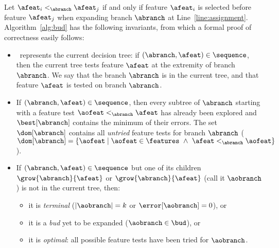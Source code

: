 \documentclass{article}
\begin{document}

Let $\afeat_i <_{\abranch} \afeat_j$ if and only if feature $\afeat_i$ is selected before feature $\afeat_j$ when expanding branch $\abranch$ at Line~\ref{line:assignment}. Algorithm~\ref{alg:bud} has the following invariants, from which a formal proof of correctness easily follows:

\begin{itemize}
	\item \sequence\ represents the current decision tree: if $(\abranch,\afeat) \in \sequence$, then the current tree tests feature $\afeat$ at the extremity of branch $\abranch$. We say that the branch $\abranch$ is in the current tree, and that feature $\afeat$ is tested on branch $\abranch$.
	
	\item If $(\abranch,\afeat) \in \sequence$, then every subtree of $\abranch$ starting with a feature test $\aofeat <_{\abranch} \afeat$ has already been explored and $\best[\abranch]$ contains the minimum of their errors. The set $\dom[\abranch]$ contains all \emph{untried} feature tests for branch $\abranch$ ($\dom[\abranch] = \{\aofeat \mid \aofeat \in \features ~\wedge~ \afeat <_{\abranch} \aofeat \}$).
	
	\item If $(\abranch,\afeat) \in \sequence$ but one of its children $\grow{\abranch}{\afeat}$ or $\grow{\abranch}{\afeat}$ (call it $\aobranch$) is not in the current tree, then:

	\begin{itemize}
		\item it is \emph{terminal} ($|\aobranch|=k$ or $\error[\aobranch]=0$), or
		\item it is a \emph{bud} yet to be expanded ($\aobranch \in \bud$), or
		\item it is \emph{optimal}: all possible feature tests have been tried for $\aobranch$.
	\end{itemize}
\end{itemize}
\end{document}
